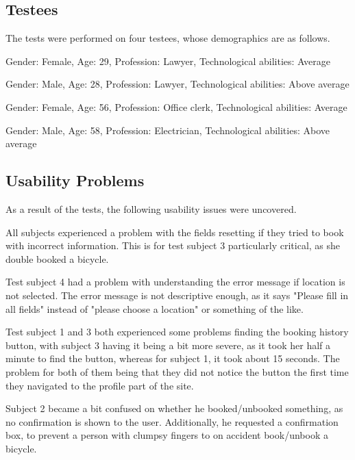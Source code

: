 \subsection{Testees}
The tests were performed on four testees, whose demographics are as follows.
\begin{description}[style=nextline]
\item[Subject 1]
Gender: Female, Age: 29, Profession: Lawyer, Technological abilities: Average
\item[Subject 2]
Gender: Male, Age: 28, Profession: Lawyer, Technological abilities: Above average
\item[Subject 3]
Gender: Female, Age: 56, Profession: Office clerk, Technological abilities: Average
\item[Subject 4]
Gender: Male, Age: 58, Profession: Electrician, Technological abilities: Above average
\end{description}

\subsection{Usability Problems}
As a result of the tests, the following usability issues were uncovered.

\begin{description}[style=nextline]
	\item[{\#}1 Fields reset]
		All subjects experienced a problem with the fields resetting if they tried to book with incorrect information.
		This is for test subject 3 particularly critical, as she double booked a bicycle.
	\item[{\#}2 Error message understandability] Test subject 4 had a problem with understanding the error message if location is not selected.
												The error message is not descriptive enough, as it says "Please fill in all fields" instead of "please choose a location" or something of the like.
	\item[{\#}3 Difficulty finding history] Test subject 1 and 3 both experienced some problems finding the booking history button, with subject 3 having it being a bit more severe, as it took her half a minute to find the button, whereas for subject 1, it took about 15 seconds. The problem for both of them being that they did not notice the button the first time they navigated to the profile part of the site.
	\item[{\#}4 Booking/Unbooking confirmation] Subject 2 became a bit confused on whether he booked/unbooked something, as no confirmation is shown to the user.
												Additionally, he requested a confirmation box, to prevent a person with clumpsy fingers to on accident book/unbook a bicycle.
\end{description}

